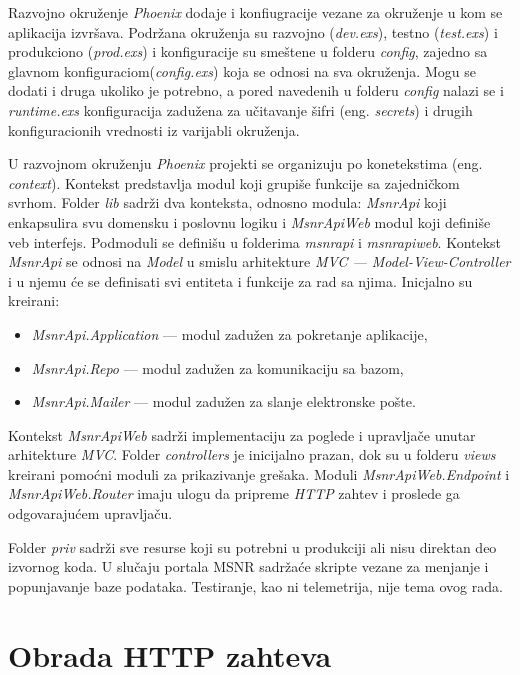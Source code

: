 \documentclass[12pt,oneside]{memoir}
\begin{document}
Razvojno okruženje \emph{Phoenix} dodaje i konfiugracije vezane za okruženje u kom se aplikacija izvršava. 
Podržana okruženja su razvojno (\emph{dev.exs}), testno (\emph{test.exs}) i produkciono (\emph{prod.exs}) i konfiguracije su smeštene u folderu \emph{config},
zajedno sa glavnom konfiguraciom(\emph{config.exs}) koja se odnosi na sva okruženja. Mogu se dodati i druga ukoliko je potrebno, a pored navedenih
u folderu \emph{config} nalazi se i \emph{runtime.exs} konfiguracija zadužena za učitavanje šifri (eng. \emph{secrets}) i drugih konfiguracionih vrednosti
iz varijabli okruženja.

U razvojnom okruženju \emph{Phoenix} projekti se organizuju po konetekstima (eng. \emph{context}). Kontekst predstavlja modul koji grupiše funkcije sa
zajedničkom svrhom. Folder \emph{lib} sadrži dva konteksta, odnosno modula: \emph{MsnrApi} koji enkapsulira svu domensku i
poslovnu logiku i \emph{MsnrApiWeb} modul koji definiše veb interfejs. Podmoduli se definišu u folderima \emph{msnr{\textunderscore}api}
i \emph{msnr{\textunderscore}api{\textunderscore}web}. 
Kontekst \emph{MsnrApi} se odnosi na \emph{Model} u smislu arhitekture \emph{MVC --- Model-View-Controller} i u njemu će se definisati svi entiteta i
funkcije za rad sa njima. Inicjalno su kreirani:
\begin{itemize}
  \item \emph{MsnrApi.Application} --- modul zadužen za pokretanje aplikacije,
  \item \emph{MsnrApi.Repo} --- modul zadužen za komunikaciju sa bazom,
  \item \emph{MsnrApi.Mailer} --- modul zadužen za slanje elektronske pošte.
\end{itemize}
Kontekst \emph{MsnrApiWeb} sadrži implementaciju za poglede i upravljače unutar arhitekture \emph{MVC}.
Folder \emph{controllers} je inicijalno prazan, dok su u folderu \emph{views} kreirani pomoćni moduli za prikazivanje grešaka.
Moduli \emph{MsnrApiWeb.Endpoint} i \emph{MsnrApiWeb.Router} imaju ulogu da pripreme \emph{HTTP} zahtev i proslede ga odgovarajućem
upravljaču.

Folder \emph{priv} sadrži sve resurse koji su potrebni u produkciji ali nisu direktan deo izvornog koda. U slučaju portala MSNR
sadržaće skripte vezane za menjanje i popunjavanje baze podataka. Testiranje, kao ni telemetrija, nije tema ovog rada.

\section{Obrada HTTP zahteva}
\end{document}
